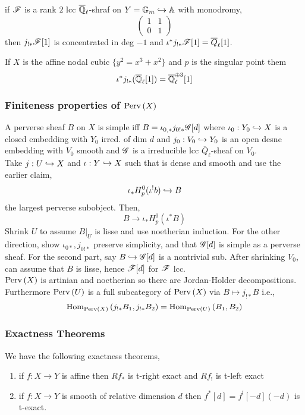 \documentclass[12pt]{article}
\begin{document}
\begin{example}
if $\mathscr{F}$ is a rank $2$ lcc $\overline{\mathbb{Q}}_\ell$-shraf on $Y = \mathbb{G}_m \hookrightarrow \mathbb{A}$ with monodromy,
\[
\begin{pmatrix}
1 & 1 
\\
0 & 1
\end{pmatrix}
\]
then $j_{!*} \mathscr{F}[1]$ is concentrated in deg $-1$ and $\iota^* j_{! *} \mathscr{F}[1] = \overline{Q}_\ell[1]$. 
\end{example}

\begin{example}
If $X$ is the affine nodal cubic $\{ y^2 = x^3 + x^2 \}$ and $p$ is the singular point them
\[ \iota^* j_{!*} (\overline{\mathbb{Q}}_\ell[1]) = \overline{\mathbb{Q}}_\ell^{\oplus 3}[1] \] 
\end{example}

\subsubsection{Finiteness properties of $\mathrm{Perv}\left( X \right)$}

A perverse sheaf $B$ on $X$ is simple iff $B = \iota_{0,*} j_{0!*} \mathscr{G}[d]$ where $\iota_0 : Y_0 \hookrightarrow X$ is a closed embedding with $Y_0$ irred. of dim $d$ and $j_0 : V_0 \hookrightarrow Y_0$ is an open desne embedding with $V_0$ smooth and $\mathscr{G}$ is a irreducible lcc $\overline{Q}_\ell$-sheaf on $V_0$. 
\bigskip\\
Take $j : U \hookrightarrow X$ and $\iota : Y \hookrightarrow X$ such that is dense and smooth and use the earlier claim,
\[ \iota_* H_p^0(\iota^! b) \hookrightarrow B \]
the largest perverse subobject. Then,
\[ B \to \iota_* H_p^0(\iota^* B) \]
Shrink $U$ to assume $B|_U$ is lisse and use noetherian induction. For the other direction, show $\iota_{0*}, j_{0!*}$ preserve simplicity, and that $\mathscr{G}[d]$ is simple as a perverse sheaf. For the second part, say $B \hookrightarrow \mathscr{G}[d]$ is a nontrivial sub. After shrinking $V_0$, can assume that $B$ is lisse, hence $\mathscr{F}[d]$ for $\mathscr{F}$ lcc.
\bigskip\\
$\mathrm{Perv}\left( X \right)$ is artinian and noetherian so there are Jordan-Holder decompositions. Furthermore $\mathrm{Perv}\left( U \right)$ is a full subcategory of $\mathrm{Perv}\left( X \right)$ via $B \mapsto j_{!*} B$ i.e.,
\[ \mathrm{Hom}_{\mathrm{Perv}\left( X \right)} \left( j_{!*} B_1, j_{!*} B_2 \right) = \mathrm{Hom}_{\mathrm{Perv}\left( U \right)} \left( B_1, B_2 \right) \]

\subsubsection{Exactness Theorems}

\begin{theorem}
We have the following exactness theorems,
\begin{enumerate}
\item if $f : X \to Y$ is affine then $R f_*$ is t-right exact and $R f_!$ is t-left exact
\item if $f : X \to Y$ is smooth of relative dimension $d$ then $f^*[d] = f^![-d](-d)$ is t-exact. 
\end{enumerate}
\end{theorem} 
\end{document}
